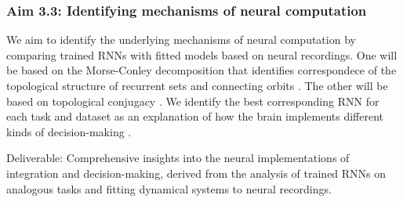 \documentclass[12pt,letterpaper, onecolumn]{article}
\theoremstyle{definition}
\theoremstyle{remark}
\begin{document}
\subsubsection*{Aim 3.3: Identifying mechanisms of neural computation}
We aim to identify the underlying mechanisms of neural computation by comparing trained RNNs with fitted models based on neural recordings.  One will be based on the Morse-Conley decomposition that identifies correspondece of the topological structure of recurrent sets and connecting orbits \citep{arai2009}. The other will be based on topological conjugacy \citep{ostrow2024beyond}.
We identify the best corresponding RNN for each task and dataset as an explanation of how the brain implements different kinds of decision-making \citep{levenstein2023}.
 


Deliverable:  Comprehensive insights into the neural implementations of integration and decision-making, derived from the analysis of trained RNNs on analogous tasks and fitting dynamical systems to neural recordings.

\newpage
\printbibliography
\end{document}
